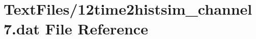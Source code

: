 \hypertarget{12time2histsim__channel7_8dat}{}\section{Text\+Files/12time2histsim\+\_\+channel7.dat File Reference}
\label{12time2histsim__channel7_8dat}
